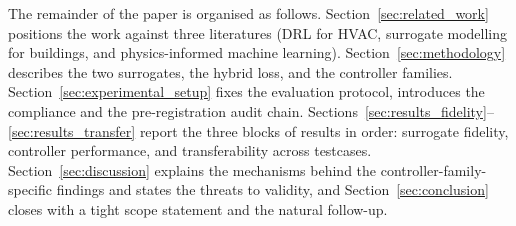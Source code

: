 The remainder of the paper is organised as follows.
Section~\ref{sec:related_work} positions the work against three
literatures (DRL for HVAC, surrogate modelling for buildings, and
physics-informed machine learning).
Section~\ref{sec:methodology} describes the two surrogates, the
hybrid loss, and the controller families.
Section~\ref{sec:experimental_setup} fixes the evaluation protocol,
introduces the \cite{HouEvins2024} compliance and the
pre-registration audit chain.
Sections~\ref{sec:results_fidelity}--\ref{sec:results_transfer}
report the three blocks of results in order: surrogate fidelity,
controller performance, and transferability across testcases.
Section~\ref{sec:discussion} explains the mechanisms behind the
controller-family-specific findings and states the threats to
validity, and Section~\ref{sec:conclusion} closes with a tight scope
statement and the natural follow-up.
